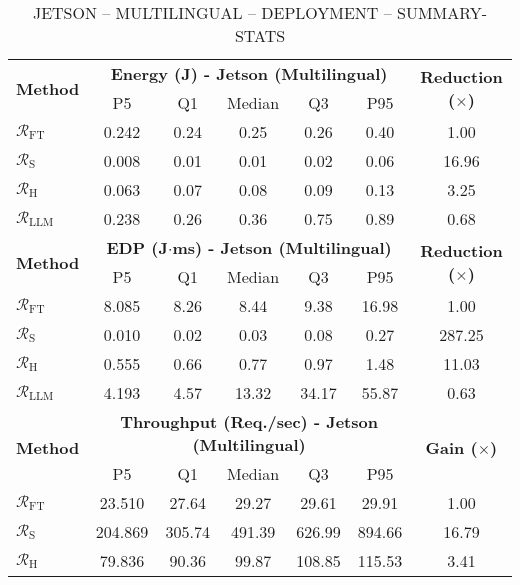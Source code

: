 \begin{table}[t]
\centering
\scriptsize
\caption{JETSON -- MULTILINGUAL -- DEPLOYMENT -- SUMMARY-STATS}
\label{tab:jetson_rq3}
\begin{tabular}{lcccccc}
\toprule
\multirow{2}{*}{\textbf{Method}} 
& \multicolumn{5}{c}{\textbf{Energy (J) - Jetson (Multilingual)}} & \multirow{2}{*}{\textbf{Reduction ($\times$)}} \\
\cmidrule(lr){2-6}
 & P5 & Q1 & Median & Q3 & P95 &  \\
\midrule
$\mathcal{R}_\text{FT}$ & 0.242 & 0.24 & 0.25 & 0.26 & 0.40 & 1.00 \\ %
$\mathcal{R}_\text{S}$ & 0.008 & 0.01 & 0.01 & 0.02 & 0.06 & 16.96 \\ %
$\mathcal{R}_\text{H}$ & 0.063 & 0.07 & 0.08 & 0.09 & 0.13 & 3.25 \\ %
$\mathcal{R}_\text{LLM}$ & 0.238 & 0.26 & 0.36 & 0.75 & 0.89 & 0.68 \\ %
\midrule
\multirow{2}{*}{\textbf{Method}} 
& \multicolumn{5}{c}{\textbf{EDP (J$\cdot$ms) - Jetson (Multilingual)}} & \multirow{2}{*}{\textbf{Reduction ($\times$)}} \\
\cmidrule(lr){2-6}
 & P5 & Q1 & Median & Q3 & P95 & \\
\midrule
$\mathcal{R}_\text{FT}$ & 8.085 & 8.26 & 8.44 & 9.38 & 16.98 & 1.00 \\ %
$\mathcal{R}_\text{S}$ & 0.010 & 0.02 & 0.03 & 0.08 & 0.27 & 287.25 \\ %
$\mathcal{R}_\text{H}$ & 0.555 & 0.66 & 0.77 & 0.97 & 1.48 & 11.03 \\ %
$\mathcal{R}_\text{LLM}$ & 4.193 & 4.57 & 13.32 & 34.17 & 55.87 & 0.63 \\ %
\midrule
\multirow{2}{*}{\textbf{Method}} 
& \multicolumn{5}{c}{\textbf{Throughput (Req./sec) - Jetson (Multilingual)}} & \multirow{2}{*}{\textbf{Gain ($\times$)}} \\
\cmidrule(lr){2-6}
 & P5 & Q1 & Median & Q3 & P95 & \\
\midrule
$\mathcal{R}_\text{FT}$ & 23.510 & 27.64 & 29.27 & 29.61 & 29.91 & 1.00 \\ %
$\mathcal{R}_\text{S}$ & 204.869 & 305.74 & 491.39 & 626.99 & 894.66 & 16.79 \\ %
$\mathcal{R}_\text{H}$ & 79.836 & 90.36 & 99.87 & 108.85 & 115.53 & 3.41 \\ %

\end{tabular}
\end{table}
